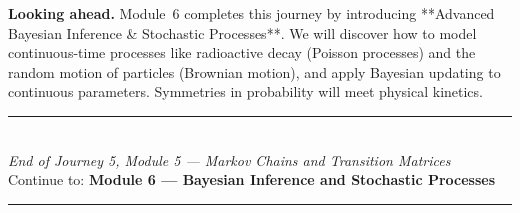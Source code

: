 \documentclass[12pt, a4paper]{article}
\begin{document}
\medskip
\noindent\textbf{Looking ahead.}
Module~6 completes this journey by introducing **Advanced Bayesian Inference & Stochastic Processes**. We will discover how to model continuous-time processes like radioactive decay (Poisson processes) and the random motion of particles (Brownian motion), and apply Bayesian updating to continuous parameters. Symmetries in probability will meet physical kinetics.

\vspace{1.4cm}
\begin{center}
{\color{MidBlue}\rule{0.5\linewidth}{0.8pt}}\\[6pt]
{\small\color{DarkGrey}\textit{End of Journey 5, Module 5 --- Markov Chains and Transition Matrices}}\\[4pt]
{\small\color{DarkGrey}Continue to: \textbf{Module 6 --- Bayesian Inference and Stochastic Processes}}\\[6pt]
{\color{MidBlue}\rule{0.5\linewidth}{0.8pt}}
\end{center}
\end{document}
